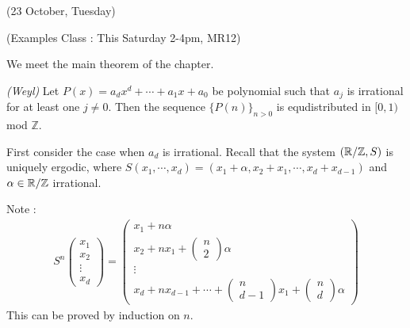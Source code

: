 \documentclass[12pt,a4paper]{report}
\newenvironment{proof}
{\begin{changemargin}{1cm}{0.5cm} 
	}%
	{\end{changemargin}
}
\begin{document}
\newday

(23 October, Tuesday)
\s

(Examples Class : This Saturday 2-4pm, MR12)
\s

We meet the main theorem of the chapter.
\s

\thm \emph{(Weyl)} Let $P(x) = a_d x^d + \cdots + a_1 x + a_0$ be polynomial such that $a_j$ is irrational for at least one $j\neq 0$. Then the sequence $\{ P(n) \}_{n>0}$ is equdistributed in $[0,1)$ mod $\mathbb{Z}$.
\begin{proof}
\pf First consider the case when $a_d$ is irrational. Recall that the system $(\mathbb{R}/\mathbb{Z}, S)$ is uniquely ergodic, where $S(x_1, \cdots, x_d) = (x_1 + \alpha, x_2 +x_1, \cdots, x_d + x_{d-1})$ and $\alpha \in \mathbb{R}/\mathbb{Z}$ irrational.

\quad Note :
\begin{align*}
S^n \begin{pmatrix}
x_1 \\
x_2 \\
\vdots \\
x_d
\end{pmatrix} = \begin{pmatrix}
x_1 + n \alpha \\
x_2 + n x_1 + \begin{pmatrix}
n\\
2
\end{pmatrix} \alpha \\
\vdots \\
x_d + n x_{d-1} +  \cdots + \begin{pmatrix}
n \\
d-1
\end{pmatrix} x_1 + \begin{pmatrix}
n \\
d
\end{pmatrix} \alpha
\end{pmatrix}
\end{align*}
This can be proved by induction on $n$.


\end{proof}
\end{document}
